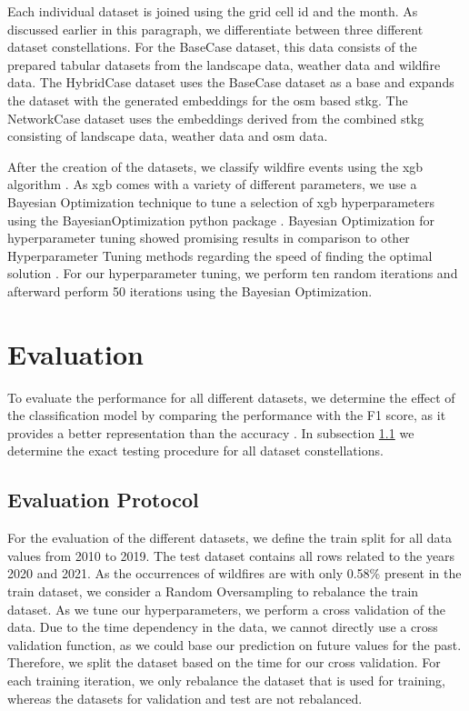 \documentclass[
]{ceurart}
\begin{document}
Each individual dataset is joined using the grid cell \gls*{id} and the month. As discussed earlier in this paragraph, we differentiate between three different dataset constellations. For the BaseCase dataset, this data consists of the prepared tabular datasets from the landscape data, weather data and wildfire data. The HybridCase dataset uses the BaseCase dataset as a base and expands the dataset with the generated embeddings for the \gls*{osm} based \gls*{stkg}. The NetworkCase dataset uses the embeddings derived from the combined \gls*{stkg} consisting of landscape data, weather data and \gls*{osm} data.

After the creation of the datasets, we classify wildfire events using the \gls*{xgb} algorithm \cite{Chen.2016}. As \gls*{xgb} comes with a variety of different parameters, we use a Bayesian Optimization technique to tune a selection of \gls*{xgb} hyperparameters using the BayesianOptimization python package \cite{Nogueira.2014}. Bayesian Optimization for hyperparameter tuning showed promising results in comparison to other Hyperparameter Tuning methods regarding the speed of finding the optimal solution \cite{Snoek.2012}. For our hyperparameter tuning, we perform ten random iterations and afterward perform 50 iterations using the Bayesian Optimization. %

\section{Evaluation}
To evaluate the performance for all different datasets, we determine the effect of the classification model by comparing the performance with the F1 score, as it provides a better representation than the accuracy \cite{Maimon.2010}. In subsection \ref{cha:EvaluationProtocol} we determine the exact testing procedure for all dataset constellations.

\subsection{Evaluation Protocol}\label{cha:EvaluationProtocol}
For the evaluation of the different datasets, we define the train split for all data values from 2010 to 2019. The test dataset contains all rows related to the years 2020 and 2021. As the occurrences of wildfires are with only 0.58\% present in the train dataset, we consider a Random Oversampling to rebalance the train dataset. As we tune our hyperparameters, we perform a cross validation of the data. Due to the time dependency in the data, we cannot directly use a cross validation function, as we could base our prediction on future values for the past. Therefore, we split the dataset based on the time for our cross validation. For each training iteration, we only rebalance the dataset that is used for training, whereas the datasets for validation and test are not rebalanced.
\end{document}
